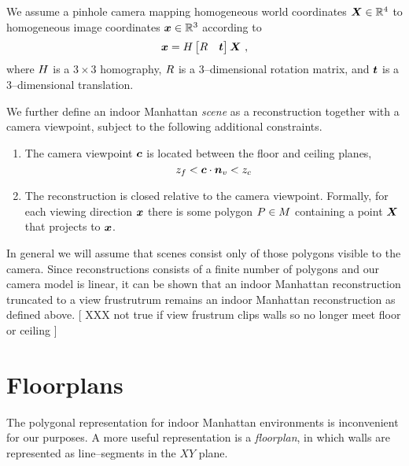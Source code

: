 We assume a pinhole camera mapping homogeneous world coordinates
$\vect{X}\in\Rfour$ to homogeneous image coordinates $\vect{x}\in\Rthree$
according to
\begin{equation}
  \vect{x} = 
  \CamMatrix \begin{bmatrix} \CamR & \vect{t} \end{bmatrix} \vect{X} ~,
\end{equation}
where $\CamMatrix$ is a $3 \times 3$ homography, $\CamR$ is a
3--dimensional rotation matrix, and $\vect{t}$ is a 3--dimensional
translation.

We further define an indoor Manhattan \textit{scene} as a
reconstruction together with a camera viewpoint, subject to the
following additional constraints.
\begin{enumerate}
  \item{The camera viewpoint $\vect{c}$ is located between the floor
    and ceiling planes,
    \begin{equation}
      \zfloor < \vect{c} \cdot \vertnormal < \zceil
    \end{equation}
  }
  \item{The reconstruction is closed relative to the camera
    viewpoint. Formally, for each viewing direction $\vect{x}$ there
    is some polygon $\Poly\in\Reconstruction$ containing a point
    $\vect{X}$ that projects to $\vect{x}$.
  }
\end{enumerate}

In general we will assume that scenes consist only of those polygons
visible to the camera. Since reconstructions consists of a finite
number of polygons and our camera model is linear, it can be shown
that an indoor Manhattan reconstruction truncated to a view
frustrutrum remains an indoor Manhattan reconstruction as defined
above. [ XXX not true if view frustrum clips walls so no longer meet
  floor or ceiling ]

\section{Floorplans}

The polygonal representation for indoor Manhattan environments is
inconvenient for our purposes. A more useful representation is a
\textit{floorplan}, in which walls are represented as line--segments
in the $XY$ plane.

